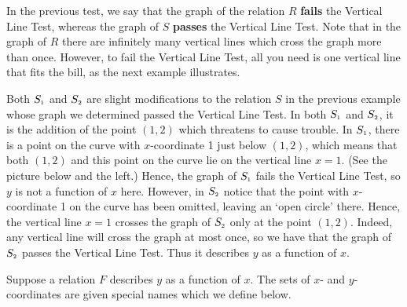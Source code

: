 \medskip

In the previous test, we say that the graph of the relation $R$ \textbf{fails} the Vertical Line Test, whereas the graph of $S$ \textbf{passes} the Vertical Line Test.  Note that in the graph of $R$ there are infinitely many vertical lines which cross the graph more than once. However, to fail the Vertical Line Test, all you need is one vertical line that fits the bill, as the next example illustrates.

\medskip

{
Both $S_{\mbox{\tiny$1$}}$ and $S_{\mbox{\tiny$2$}}$ are slight modifications to the relation $S$ in the previous example whose graph we determined passed the Vertical Line Test.  In both $S_{\mbox{\tiny$1$}}$ and $S_{\mbox{\tiny$2$}}$, it is the addition of the point $(1,2)$ which threatens to cause trouble.  In $S_{\mbox{\tiny$1$}}$, there is a point on the curve with $x$-coordinate 1 just below $(1,2)$, which means that both $(1,2)$ and this point on the curve lie on the vertical line $x=1$.  (See the picture below and the left.)  Hence, the graph of  $S_{\mbox{\tiny$1$}}$ fails the Vertical Line Test, so $y$ is not a function of $x$ here.  However, in $S_{\mbox{\tiny$2$}}$ notice that the point with $x$-coordinate 1 on the curve has been omitted, leaving an `open circle' there.  Hence, the vertical line $x=1$ crosses the graph of $S_{\mbox{\tiny$2$}}$ only at the point $(1,2)$.  Indeed, any vertical line will cross the graph at most once, so we have that the graph of $S_{\mbox{\tiny$2$}}$ passes the Vertical Line Test.  Thus it describes $y$ as a function of $x$.
}


\medskip

Suppose a relation $F$ describes $y$ as a function of $x$.  The sets of $x$- and $y$-coordinates are given special names which we define below.

